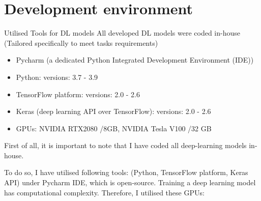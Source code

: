 \documentclass[10pt,aspectratio=169,dvipsnames]{beamer} %
\begin{document}
	\section{Development environment}
	\setcounter{subfigure}{0}
	\begin{frame}{Utilised Tools for DL models}
		All developed DL models were \alert{coded in-house} \\
		\alert{(Tailored specifically to meet tasks requirements)} 
		\begin{itemize}	
			\item \alert{Pycharm} (a dedicated Python Integrated Development Environment (IDE))		
			\item \alert{Python}: versions: 3.7 - 3.9
			\item \alert{TensorFlow} platform: versions: 2.0 - 2.6
			\item \alert{Keras} (deep learning API over TensorFlow): versions: 2.0 - 2.6
			\item \alert{GPUs}: NVIDIA RTX2080 /8GB, NVIDIA Tesla V100 /32 GB
		\end{itemize}
	\end{frame}
	\note
	{
		First of all, it is important to note that I have coded all deep-learning models in-house.
				
		To do so, I have utilised following tools:		
		(Python, TensorFlow platform, Keras API) under Pycharm IDE, which is open-source.
		Training a deep learning model has computational complexity.
		Therefore, I utilised these GPUs: 
	}
\end{document}
